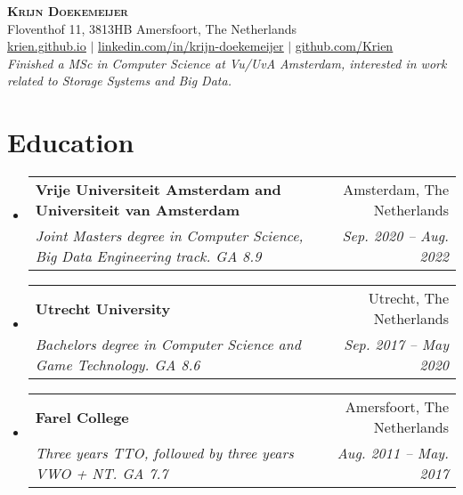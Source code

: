 \documentclass[letterpaper,11pt]{article}
\makeatletter
\newcommand{\resumeSubheading}[4]{
  \vspace{-2pt}\item
    \begin{tabular*}{0.97\textwidth}[t]{l@{\extracolsep{\fill}}r}
      \textbf{#1} & #2 \\
      \textit{\small#3} & \textit{\small #4} \\
    \end{tabular*}\vspace{-7pt}
}
\newcommand{\resumeSubHeadingListStart}{\begin{itemize}[leftmargin=0.15in, label={}]}
\newcommand{\resumeSubHeadingListEnd}{\end{itemize}}
\makeatother
\begin{document}

\begin{center}
    \textbf{\Huge \scshape Krijn Doekemeijer} \\ \vspace{1pt}
    \small Floventhof 11, 3813HB Amersfoort, The Netherlands \\ \vspace{1pt}
    \href{https://krien.github.io/}{\underline{krien.github.io}} $|$
    \href{https://linkedin.com/in/krijn-doekemeijer-9692801aa}{\underline{linkedin.com/in/krijn-doekemeijer}} $|$
    \href{https://github.com/Krien}{\underline{github.com/Krien}} \\
    \textit{ Finished a MSc in Computer Science at Vu/UvA Amsterdam, interested in work related to Storage Systems and Big Data. } 
\end{center}


\section{Education}
  \resumeSubHeadingListStart
     \resumeSubheading
      {Vrije Universiteit Amsterdam and Universiteit van Amsterdam}{Amsterdam, The Netherlands}
      {Joint Masters degree in Computer Science, Big Data Engineering track. GA 8.9}{Sep. 2020 -- Aug. 2022}
    \resumeSubheading
      {Utrecht University}{Utrecht, The Netherlands}
      {Bachelors degree in Computer Science and Game Technology. GA 8.6 }{Sep. 2017 -- May 2020}
    \resumeSubheading
      {Farel College}{Amersfoort, The Netherlands}
      {Three years TTO, followed by three years VWO + NT. GA 7.7 }{Aug. 2011 -- May. 2017}
  \resumeSubHeadingListEnd
\end{document}
